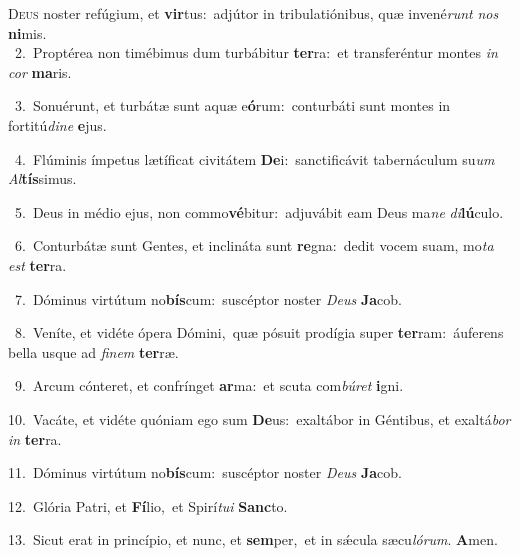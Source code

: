 \lettrine{\initial\textcolor{\initialcolor}{D}}{eus} noster refúgium, et \textbf{vir}\-tus:~\star adjútor in tribulatiónibus, quæ invené\textit{runt} \textit{nos} \textbf{ni}\-mis.\\
{\numbfont\textcolor{\numbcolor}{~2.}}~Proptérea non timébimus dum turbábitur \textbf{ter}\-ra:~\star et transferéntur montes \textit{in} \textit{cor} \textbf{ma}\-ris.\par
{\numbfont\textcolor{\numbcolor}{~3.}}~Sonuérunt, et turbátæ sunt aquæ e\-\textbf{ó}\-rum:~\star conturbáti sunt montes in fortitú\-\textit{di}\-\textit{ne} \textbf{e}\-jus.\par
{\numbfont\textcolor{\numbcolor}{~4.}}~Flúminis ímpetus lætíficat civitátem \textbf{De}\-i:~\star sanctificávit tabernáculum su\textit{um} \textit{Al}\-\textbf{tís}simus.\par
{\numbfont\textcolor{\numbcolor}{~5.}}~Deus in médio ejus, non commo\-\textbf{vé}\-bitur:~\star adjuvábit eam Deus ma\textit{ne} \textit{di}\-\textbf{lú}culo.\par
{\numbfont\textcolor{\numbcolor}{~6.}}~Conturbátæ sunt Gentes, et inclináta sunt \textbf{re}\-gna:~\star dedit vocem suam, mo\textit{ta} \textit{est} \textbf{ter}\-ra.\par
{\numbfont\textcolor{\numbcolor}{~7.}}~Dóminus virtútum no\-\textbf{bís}\-cum:~\star suscéptor noster \textit{De}\-\textit{us} \textbf{Ja}\-cob.\par
{\numbfont\textcolor{\numbcolor}{~8.}}~Veníte, et vidéte ópera Dómini,~\dagger quæ pósuit prodígia super \textbf{ter}\-ram:~\star áuferens bella usque ad \textit{fi}\-\textit{nem} \textbf{ter}\-ræ.\par
{\numbfont\textcolor{\numbcolor}{~9.}}~Arcum cónteret, et confrínget \textbf{ar}\-ma:~\star et scuta com\-\textit{bú}\-\textit{ret} \textbf{i}\-gni.\par
{\numbfont\textcolor{\numbcolor}{10.}}~Vacáte, et vidéte quóniam ego sum \textbf{De}\-us:~\star exaltábor in Géntibus, et exaltá\textit{bor} \textit{in} \textbf{ter}\-ra.\par
{\numbfont\textcolor{\numbcolor}{11.}}~Dóminus virtútum no\-\textbf{bís}\-cum:~\star suscéptor noster \textit{De}\-\textit{us} \textbf{Ja}\-cob.\par
{\numbfont\textcolor{\numbcolor}{12.}}~Glória Patri, et \textbf{Fí}\-lio,~\star et Spirí\-\textit{tu}\-\textit{i} \textbf{Sanc}\-to.\par
{\numbfont\textcolor{\numbcolor}{13.}}~Sicut erat in princípio, et nunc, et \textbf{sem}\-per,~\star et in sǽcula sæcu\-\textit{ló}\-\textit{rum}. \textbf{A}\-men.\par
